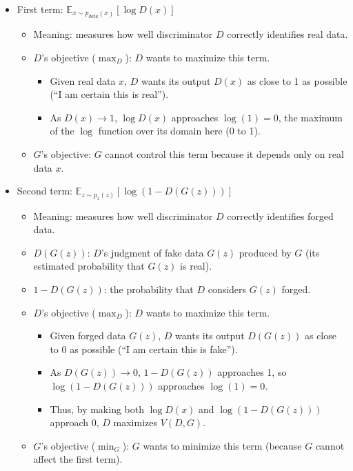 \begin{itemize}
\tightlist
\item
  First term: \(\mathbb{E}_{x\sim p_{data}(x)}[\log D(x)]\)

  \begin{itemize}
  \tightlist
  \item
    Meaning: measures how well discriminator \(D\) correctly identifies real data.
  \item
    \(D\)'s objective (\(\max_D\)): \(D\) wants to maximize this term.

    \begin{itemize}
    \tightlist
    \item
      Given real data \(x\), \(D\) wants its output \(D(x)\) as close to 1 as possible (``I am certain this is real'').
    \item
      As \(D(x)\to 1\), \(\log D(x)\) approaches \(\log(1)=0\), the maximum of the \(\log\) function over its domain here (0 to 1).
    \end{itemize}
  \item
    \(G\)'s objective: \(G\) cannot control this term because it depends only on real data \(x\).
  \end{itemize}
\item
  Second term: \(\mathbb{E}_{z\sim p_z(z)}[\log(1-D(G(z)))]\)

  \begin{itemize}
  \tightlist
  \item
    Meaning: measures how well discriminator \(D\) correctly identifies forged data.
  \item
    \(D(G(z))\): \(D\)'s judgment of fake data \(G(z)\) produced by \(G\) (its estimated probability that \(G(z)\) is real).
  \item
    \(1-D(G(z))\): the probability that \(D\) considers \(G(z)\) forged.
  \item
    \(D\)'s objective (\(\max_D\)): \(D\) wants to maximize this term.

    \begin{itemize}
    \tightlist
    \item
      Given forged data \(G(z)\), \(D\) wants its output \(D(G(z))\) as close to 0 as possible (``I am certain this is fake'').
    \item
      As \(D(G(z))\to 0\), \(1-D(G(z))\) approaches 1, so \(\log(1-D(G(z)))\) approaches \(\log(1)=0\).
    \item
      Thus, by making both \(\log D(x)\) and \(\log(1-D(G(z)))\) approach 0, \(D\) maximizes \(V(D,G)\).
    \end{itemize}
  \item
    \(G\)'s objective (\(\min_G\)): \(G\) wants to minimize this term (because \(G\) cannot affect the first term).


\end{itemize}
\end{itemize}
